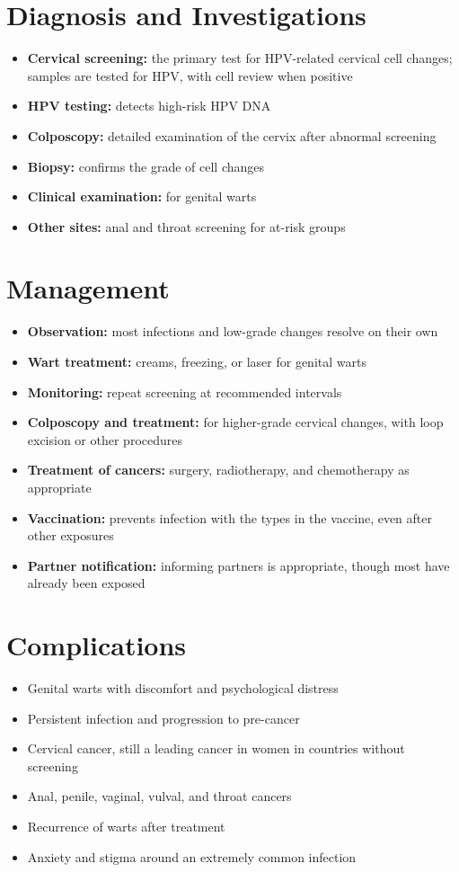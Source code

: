 \section*{Diagnosis and Investigations}
\begin{itemize}
    \item \textbf{Cervical screening:} the primary test for HPV-related cervical cell changes; samples are tested for HPV, with cell review when positive
    \item \textbf{HPV testing:} detects high-risk HPV DNA
    \item \textbf{Colposcopy:} detailed examination of the cervix after abnormal screening
    \item \textbf{Biopsy:} confirms the grade of cell changes
    \item \textbf{Clinical examination:} for genital warts
    \item \textbf{Other sites:} anal and throat screening for at-risk groups
\end{itemize}

\section*{Management}
\begin{itemize}
    \item \textbf{Observation:} most infections and low-grade changes resolve on their own
    \item \textbf{Wart treatment:} creams, freezing, or laser for genital warts
    \item \textbf{Monitoring:} repeat screening at recommended intervals
    \item \textbf{Colposcopy and treatment:} for higher-grade cervical changes, with loop excision or other procedures
    \item \textbf{Treatment of cancers:} surgery, radiotherapy, and chemotherapy as appropriate
    \item \textbf{Vaccination:} prevents infection with the types in the vaccine, even after other exposures
    \item \textbf{Partner notification:} informing partners is appropriate, though most have already been exposed
\end{itemize}

\section*{Complications}
\begin{itemize}
    \item Genital warts with discomfort and psychological distress
    \item Persistent infection and progression to pre-cancer
    \item Cervical cancer, still a leading cancer in women in countries without screening
    \item Anal, penile, vaginal, vulval, and throat cancers
    \item Recurrence of warts after treatment
    \item Anxiety and stigma around an extremely common infection
\end{itemize}

